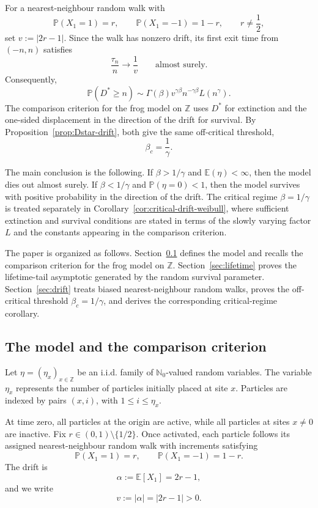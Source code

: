\documentclass[reqno,final,11pt]{amsart}
\newcommand{\Z}{\mathbb Z}
\newcommand{\Nzero}{\mathbb N_0}
\newcommand{\E}{\mathbb E}
\newcommand{\Pbb}{\mathbb P}
\theoremstyle{plain}
\theoremstyle{definition}
\theoremstyle{remark}
\numberwithin{equation}{section}
\begin{document}
For a nearest-neighbour random walk with
\[
  \Pbb(X_1=1)=r,
  \qquad
  \Pbb(X_1=-1)=1-r,
  \qquad r\ne\frac12,
\]
set \(v:=|2r-1|\). Since the walk has nonzero drift, its first exit time from \((-n,n)\) satisfies
\[
  \frac{\tau_n}{n}\longrightarrow \frac1v
  \qquad\text{almost surely}.
\]
Consequently,
\[
  \Pbb(D^*\ge n)
  \sim
  \Gamma(\beta)v^{\gamma\beta}
  n^{-\gamma\beta}L(n^\gamma).
\]
The comparison criterion for the frog model on \(\mathbb Z\) uses \(D^*\) for
extinction and the one-sided displacement in the direction of the drift for
survival. By Proposition~\ref{prop:Dstar-drift}, both give the same
off-critical threshold,
\[
  \beta_c=\frac1\gamma.
\]

 The main conclusion is the following. If \(\beta>1/\gamma\) and
 \(\E(\eta)<\infty\), then the model dies out almost surely. If
 \(\beta<1/\gamma\) and \(\Pbb(\eta=0)<1\), then the model survives with positive
 probability in the direction of the drift. The critical regime
 \(\beta=1/\gamma\) is treated separately in Corollary~\ref{cor:critical-drift-weibull},
 where sufficient extinction and survival conditions are stated in terms of the
 slowly varying factor \(L\) and the constants appearing in the comparison
 criterion.

The paper is organized as follows. Section~\ref{sec:model} defines the model
 and recalls the comparison criterion for the frog model on \(\mathbb Z\).
 Section~\ref{sec:lifetime} proves the lifetime-tail asymptotic generated by
 the random survival parameter. Section~\ref{sec:drift} treats biased
 nearest-neighbour random walks, proves the off-critical threshold
 \(\beta_c=1/\gamma\), and derives the corresponding critical-regime corollary.



\subsection{The model and the comparison criterion}\label{sec:model}

Let \(\eta=(\eta_x)_{x\in\Z}\) be an i.i.d. family of \(\Nzero\)-valued random
variables. The variable \(\eta_x\) represents the number of particles initially
placed at site \(x\). Particles are indexed by pairs \((x,i)\), with
\(1\le i\le \eta_x\).

At time zero, all particles at the origin are active, while all particles at
sites \(x\ne0\) are inactive. 
Fix \(r\in(0,1)\setminus\{1/2\}\). Once activated, each particle follows its
assigned nearest-neighbour random walk with increments satisfying
\[
  \Pbb(X_1=1)=r,
  \qquad
  \Pbb(X_1=-1)=1-r.
\]
The drift is
\[
  \alpha:=\E[X_1]=2r-1,
\]
and we write
\[
  v:=|\alpha|=|2r-1|>0.
\]
\end{document}
